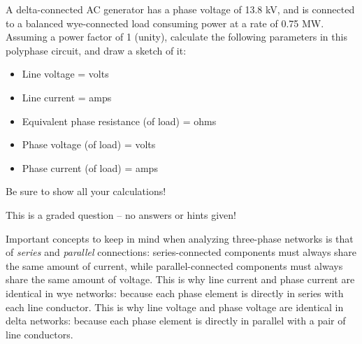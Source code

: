 

A delta-connected AC generator has a phase voltage of 13.8 kV, and is connected to a balanced wye-connected load consuming power at a rate of 0.75 MW.  Assuming a power factor of 1 (unity), calculate the following parameters in this polyphase circuit, and draw a sketch of it:

\begin{itemize}
\item{} Line voltage = \underbar{\hskip 50pt} volts
\vskip 5pt
\item{} Line current = \underbar{\hskip 50pt} amps
\vskip 5pt
\item{} Equivalent phase resistance (of load) = \underbar{\hskip 30pt} ohms
\vskip 5pt
\item{} Phase voltage (of load) = \underbar{\hskip 50pt} volts
\vskip 5pt
\item{} Phase current (of load) = \underbar{\hskip 50pt} amps
\vskip 5pt
\end{itemize}

\noindent
Be sure to show all your calculations!

\vfil

\eject






This is a graded question -- no answers or hints given!







Important concepts to keep in mind when analyzing three-phase networks is that of {\it series} and {\it parallel} connections: series-connected components must always share the same amount of current, while parallel-connected components must always share the same amount of voltage.  This is why line current and phase current are identical in wye networks: because each phase element is directly in series with each line conductor.  This is why line voltage and phase voltage are identical in delta networks: because each phase element is directly in parallel with a pair of line conductors.

\vskip 10pt


